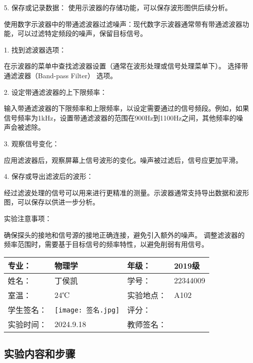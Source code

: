 \documentclass[dvipsnames, svgnames,a4paper,11pt]{article}
\begin{document}
5. 保存或记录数据：
   使用示波器的存储功能，可以保存波形图供后续分析。

   \vspace{1cm}


使用数字示波器中的带通滤波器过滤噪声：现代数字示波器通常带有带通滤波器功能，可以过滤特定频段的噪声，保留目标信号。

1. 找到滤波器选项：
   
在示波器的菜单中查找滤波器设置（通常在波形处理或信号处理菜单下）。
  选择带通滤波器（Band-pass Filter） 选项。

2. 设定带通滤波器的上下限频率：

   输入带通滤波器的下限频率和上限频率，以设定需要通过的信号频段。例如，如果信号频率为1kHz，设置带通滤波器的范围在900Hz到1100Hz之间，其他频率的噪声会被滤除。

3. 观察信号变化：
   
 应用滤波器后，观察屏幕上信号波形的变化。噪声被过滤后，信号应更加平滑。

4. 保存或导出滤波后的波形：
  
 经过滤波处理的信号可以用来进行更精准的测量。示波器通常支持导出数据和波形图，可以保存以供进一步分析。

 \vspace{1cm}
 实验注意事项：

  确保探头的接地和信号源的接地正确连接，避免引入额外的噪声。
 调整滤波器的频率范围时，需要基于目标信号的频率特性，以避免削弱有用信号。



\clearpage
\begin{table}
	\renewcommand\arraystretch{1.7}
	\centering
	\begin{tabularx}{\textwidth}{|X|X|X|X|}
	\hline
	专业：& 物理学 &年级：& 2019级 \\
	\hline
	姓名： & 丁侯凯& 学号：&22344009\\
	\hline
	室温：&24℃ & 实验地点： & A102\\
	\hline
	学生签名：& \texttt{[image: 签名.jpg]}      & 评分： &\\
	\hline
	实验时间：&2024.9.18 & 教师签名：&\\
	\hline
	\end{tabularx}
\end{table}

\subsection{实验内容和步骤}
\end{document}

